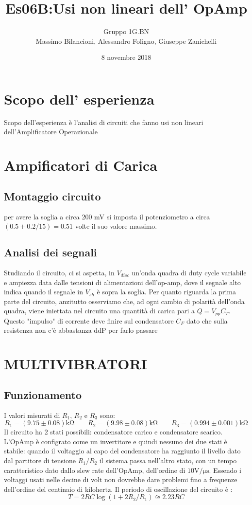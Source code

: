 \documentclass[10pt,a4paper]{article}
\author{Gruppo 1G.BN \\ Massimo Bilancioni, Alessandro Foligno, Giuseppe Zanichelli }
\title{Es06B:Usi non lineari dell’ OpAmp }
\begin{document}
	\date{8 novembre 2018}
	\maketitle
	
	
	\section*{Scopo dell' esperienza}
	Scopo dell'esperienza è l'analisi di circuiti che fanno usi non lineari dell'Amplificatore Operazionale




\section{Ampificatori di Carica}
	\subsection{Montaggio circuito}
		per avere la soglia a circa 200 \si{\milli \volt} si imposta il potenziometro a circa $(0.5+0.2/15)=0.51$ volte il suo valore massimo.
	\subsection{Analisi dei segnali}
		Studiando il circuito, ci si aspetta, in $V_{disc}$ un'onda quadra di duty cycle variabile e ampiezza data dalle tensioni di alimentazioni dell'op-amp, dove il segnale alto indica quando il segnale in $V_{sh}$ è sopra la soglia.
		Per quanto riguarda la prima parte del circuito, anzitutto osserviamo che, ad ogni cambio di polarità dell'onda quadra, viene iniettata nel circuito una quantità di carica pari a $Q=V_{pp} C_T$. Questo "impulso" di corrente deve finire sul condensatore $C_F$ dato che sulla resistenza non c'è abbastanza ddP per farlo passare
\section{ MULTIVIBRATORI }


\subsection{Funzionamento}
I valori misurati di $R_1$, $R_2$ e $R_3$ sono:
\[ R_1 = (9.75\pm 0.08)\si{\kilo\ohm} \qquad  R_2 = (9.98 \pm 0.08)\si{\kilo\ohm} \qquad   R_3 = ( 0.994 \pm0.001 ) \si{\kilo\ohm}\]
  Il circuito ha 2 stati possibili: condensatore carico e condensatore scarico. L'OpAmp è configrato come un invertitore e quindi nessuno dei due stati è stabile: quando il voltaggio al capo del condensatore ha raggiunto il livello dato dal partitore di tensione $R_1/R_2$ il sistema passa nell'altro stato, con un tempo caratteristico dato dallo slew rate dell'OpAmp, dell'ordine di $10 \si{\volt\per\micro\second}$. Essendo i voltaggi usati nelle decine di volt non dovrebbe dare problemi fino a frequenze dell'ordine del centinaio di kilohertz.\label{slew_rate_count}
Il periodo di oscillazione del circuito è : \[ T = 2 RC \log( 1+ 2 R_2/R_1) \approxeq 2.23 RC\]
\end{document}
